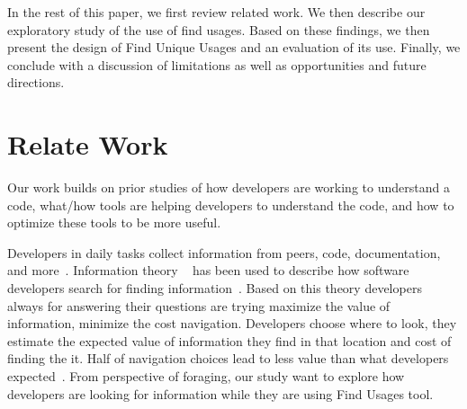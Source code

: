 \documentclass[conference]{IEEEtran}
\begin{document}
In the rest of this paper, we first review related work. We then describe our exploratory study of the use of find usages. Based on these findings, we then present the design of Find Unique Usages and an evaluation of its use. Finally, we conclude with a discussion of limitations as well as opportunities and future directions.


\section{Relate Work}
Our work builds on prior studies of how developers are working to understand a code, what/how tools are helping developers to understand the code, and how to optimize these tools to be more useful. 


Developers in daily tasks collect information from peers, code, documentation, and more~\cite{latoza2006maintaining}. Information theory ~\cite{pirolli1999informationforaging} has been used to describe how software developers search for finding information~\cite{fleming2013information}. Based on this theory developers always for answering their questions are trying maximize the value of information, minimize the cost navigation. Developers choose where to look, they estimate the expected value of information they find in that location and cost of finding the it. Half of navigation choices lead to less value than what developers expected~\cite{piorkowski2016foraging}. From perspective of foraging, our study want to explore how developers are looking for information while they are using Find Usages tool.\par
\end{document}
